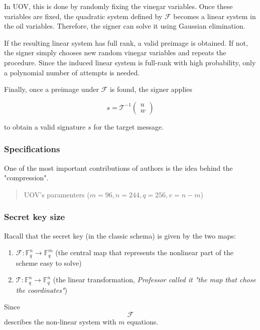 \noindent
In UOV, this is done by randomly fixing the vinegar variables. Once these variables are fixed, the quadratic system defined by \(\mathcal{F}\) becomes a linear system in the oil variables. Therefore, the signer can solve it using 
Gaussian elimination.
\medskip

\noindent
If the resulting linear system has full rank, a valid preimage is obtained. If not, the signer simply chooses new random vinegar variables and repeats the 
procedure. Since the induced linear system is full-rank with high probability, only a polynomial number of attempts is needed.
\medskip

\noindent
Finally, once a preimage under \(\mathcal{F}\) is found, the signer applies

\[
s = \mathcal{T}^{-1}
\begin{pmatrix}
u \\
w
\end{pmatrix}
\]

\noindent
to obtain a valid signature \(s\) for the target message.

\subsubsection{Specifications}
One of the most important contributions of authors is the idea behind the "compression".

\begin{quotation}
    UOV's paramenters ($m = 96, n= 244, q=256, v=n-m$)
\end{quotation}

\subsubsection*{Secret key size}
Racall that the secret key (in the classic schema) is given by the two maps:

\begin{enumerate}
    \item $\mathcal{F}: \mathbb{F}_q^n \to \mathbb{F}_q^m$ (the central map that represents the nonlinear part of the scheme easy to solve)
    \item $\mathcal{T}: \mathbb{F}_q^n \to \mathbb{F}_q^n$ (the linear transformation, \textit{Professor called it "the map that chose the coordinates"})
\end{enumerate}

\noindent
Since \[
\mathcal{F}
\]
describes the non-linear system with \(m\) equations.

